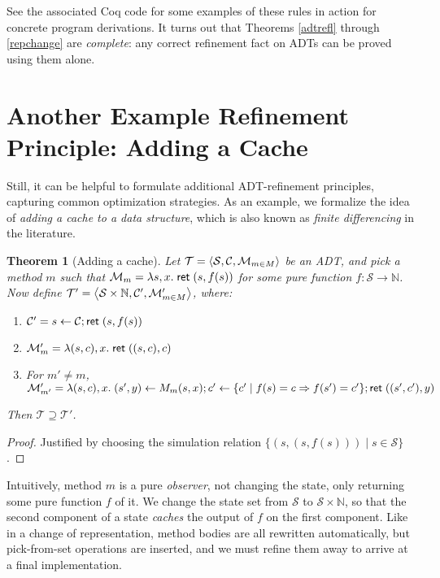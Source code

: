 \documentclass{amsbook}
\newtheorem{theorem}{Theorem}[chapter]
\theoremstyle{definition}
\theoremstyle{remark}
\numberwithin{section}{chapter}
\numberwithin{equation}{chapter}
\begin{document}
See the associated Coq code for some examples of these rules in action for concrete program derivations.
It turns out that Theorems \ref{adtrefl} through \ref{repchange} are \emph{complete}: any correct refinement fact on ADTs can be proved using them alone.

\section{Another Example Refinement Principle: Adding a Cache}

Still, it can be helpful to formulate additional ADT-refinement principles, capturing common optimization strategies.
As an example, we formalize the idea of \emph{adding a cache to a data structure}, which is also known as \emph{finite differencing} in the literature.

\begin{theorem}[Adding a cache]
  Let $\mathcal T = {\left \langle \mathcal S, \mathcal C, \mathcal M_{m \in M} \right \rangle}$ be an ADT, and pick a method $m$ such that $\mathcal M_m = \lambda s, x. \; \mathsf{ret} \; (s, f(s))$ for some pure function $f : \mathcal S \to \mathbb N$.
  Now define $\mathcal T' = {\left \langle \mathcal S \times \mathbb N, \mathcal C', \mathcal M'_{m \in M} \right \rangle}$, where:
  \begin{enumerate}
  \item $\mathcal C' = s \leftarrow \mathcal C; \mathsf{ret} \; (s, f(s))$
  \item $\mathcal M'_m = \lambda (s, c), x. \; \mathsf{ret} \; ((s, c), c)$
  \item For $m' \neq m$, $\mathcal M'_{m'} = \lambda (s, c), x. \; \mathcal (s', y) \leftarrow M_m(s, x); c' \leftarrow \{c' \mid f(s) = c \Rightarrow f(s') = c'\}; \mathsf{ret} \; ((s', c'), y)$
  \end{enumerate}
  Then $\mathcal T \supseteq \mathcal T'$.
\end{theorem}
\begin{proof}
  Justified by choosing the simulation relation $\{(s, (s, f(s))) \mid s \in \mathcal S\}$.
\end{proof}

Intuitively, method $m$ is a pure \emph{observer}, not changing the state, only returning some pure function $f$ of it.
We change the state set from $\mathcal S$ to $\mathcal S \times \mathbb N$, so that the second component of a state \emph{caches} the output of $f$ on the first component.
Like in a change of representation, method bodies are all rewritten automatically, but pick-from-set operations are inserted, and we must refine them away to arrive at a final implementation.
\end{document}
